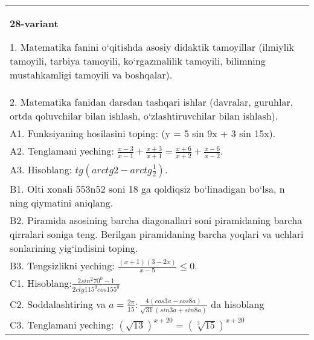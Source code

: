 \documentclass{article}
\begin{document}
\begin{tabular}{m{17cm}}
\textbf{28-variant}

1. Matematika fanini o‘qitishda asosiy didaktik tamoyillar (ilmiylik tamoyili, tarbiya tamoyili, ko‘rgazmalilik tamoyili, bilimning mustahkamligi tamoyili va boshqalar). \\
2. Matematika fanidan darsdan tashqari ishlar (davralar, guruhlar, ortda qoluvchilar bilan ishlash, o‘zlashtiruvchilar bilan ishlash). \\
A1. Funksiyaning hosilasini toping: (y = 5 sin 9x + 3 sin 15x). \\
A2. Tenglamani yeching: \(\frac{x - 3}{x - 1} + \frac{x + 3}{x + 1} = \frac{x + 6}{x + 2} + \frac{x - 6}{x - 2}\). \\
A3. Hisoblang: \(tg\left(arctg2 - arctg\frac{1}{2} \right) \). \\
B1. Olti xonali 553n52 soni 18 ga qoldiqsiz bo‘linadigan bo‘lsa, n ning qiymatini aniqlang. \\
B2. Piramida asosining barcha diagonallari soni piramidaning barcha qirralari soniga teng. Berilgan piramidaning barcha yoqlari va uchlari sonlarining yig‘indisini toping. \\
B3. Tengsizlikni yeching: \(\frac{ (x + 1) (3 - 2x) }{x - 5} \leq 0\). \\
C1. Hisoblang:\(\frac{2sin^{2}70^{0} - 1}{2ctg115^{0}cos155^{0}}\) \\
C2. Soddalashtiring va \(a = \frac{2\pi}{15}:\frac{4 (cos3a - cos8a) }{\sqrt{31} (sin3a + sin8a) }\) da hisoblang \\
C3. Tenglamani yeching: \((\sqrt{13}) ^{x + 20} = (\sqrt[3]{15}) ^{x + 20}\) \\

\end{tabular}
\vspace{1cm}
\end{document}
